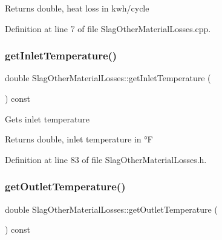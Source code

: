 \begin{DoxyReturn}{Returns}
double, heat loss in kwh/cycle 
\end{DoxyReturn}


Definition at line 7 of file Slag\+Other\+Material\+Losses.\+cpp.

\mbox{\label{class_slag_other_material_losses_aebd0f1b7d6c4bf0deb8ce8a86c5a80a7}} 
\subsubsection{\texorpdfstring{get\+Inlet\+Temperature()}{getInletTemperature()}}
{\footnotesize\ttfamily double Slag\+Other\+Material\+Losses\+::get\+Inlet\+Temperature (\begin{DoxyParamCaption}{ }\end{DoxyParamCaption}) const\hspace{0.3cm}{\ttfamily [inline]}}

Gets inlet temperature

\begin{DoxyReturn}{Returns}
double, inlet temperature in °F 
\end{DoxyReturn}


Definition at line 83 of file Slag\+Other\+Material\+Losses.\+h.

\mbox{\label{class_slag_other_material_losses_a1c48f1a70aaf030451b7e350f3d6cd18}} 
\subsubsection{\texorpdfstring{get\+Outlet\+Temperature()}{getOutletTemperature()}}
{\footnotesize\ttfamily double Slag\+Other\+Material\+Losses\+::get\+Outlet\+Temperature (\begin{DoxyParamCaption}{ }\end{DoxyParamCaption}) const\hspace{0.3cm}{\ttfamily [inline]}}

